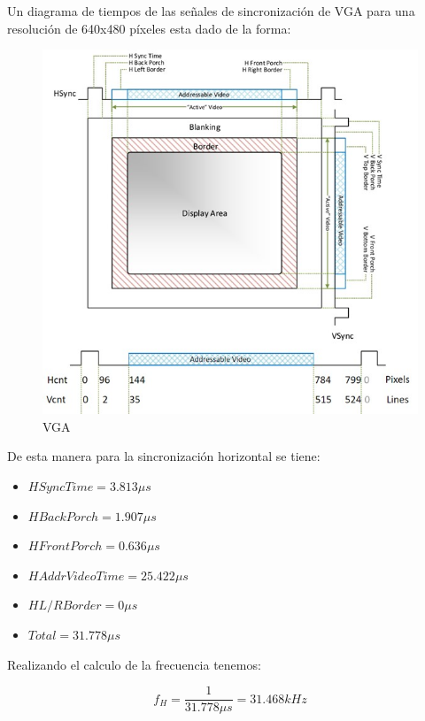 \documentclass[journal,trans]{IEEEtran}
\begin{document}
	Un diagrama de tiempos de las señales de sincronización de VGA para una resolución de 640x480 píxeles esta dado de la forma:
	
	\begin{figure}[hbtp]
		\centering
		\includegraphics[width = \columnwidth]{imagenes/vgapic.jpg}
		\caption[Figura1]{VGA \cite{vga}}
		\label{fig:VGA}
	\end{figure}
	
	De esta manera para la sincronización horizontal se tiene: 
	\begin{itemize}
		\item $H Sync Time = 3.813 \mu s$
		\item $H Back Porch = 1.907 \mu s$
		\item $H Front Porch = 0.636 \mu s$
		\item $H Addr Video Time = 25.422 \mu s$
		\item $H L/R Border = 0 \mu s$
		\item $Total = 31.778 \mu s$
	\end{itemize}
	
	Realizando el calculo de la frecuencia tenemos:
	
	\begin{equation}
		f_{H} = \frac{1}{31.778 \mu s} = 31.468 kHz
	\end{equation}
	
\end{document}
